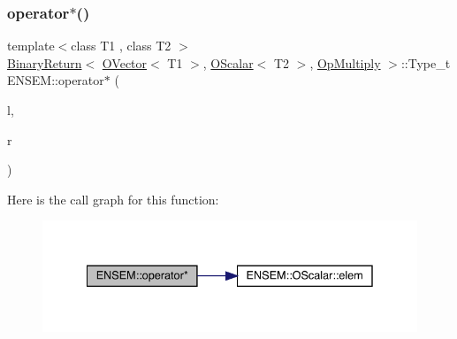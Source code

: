 \subsubsection{\texorpdfstring{operator$\ast$()}{operator*()}\hspace{0.1cm}{\footnotesize\ttfamily [3/8]}}
{\footnotesize\ttfamily template$<$class T1 , class T2 $>$ \\
\mbox{\hyperlink{structENSEM_1_1BinaryReturn}{Binary\+Return}}$<$ \mbox{\hyperlink{classENSEM_1_1OVector}{O\+Vector}}$<$ T1 $>$, \mbox{\hyperlink{classENSEM_1_1OScalar}{O\+Scalar}}$<$ T2 $>$, \mbox{\hyperlink{structENSEM_1_1OpMultiply}{Op\+Multiply}} $>$\+::Type\+\_\+t E\+N\+S\+E\+M\+::operator$\ast$ (\begin{DoxyParamCaption}\item[{const \mbox{\hyperlink{classENSEM_1_1OVector}{O\+Vector}}$<$ T1 $>$ \&}]{l,  }\item[{const \mbox{\hyperlink{classENSEM_1_1OScalar}{O\+Scalar}}$<$ T2 $>$ \&}]{r }\end{DoxyParamCaption})\hspace{0.3cm}{\ttfamily [inline]}}

Here is the call graph for this function\+:\nopagebreak
\begin{figure}[H]
\begin{center}
\leavevmode
\includegraphics[width=335pt]{da/d59/group__obsvector_gabb4c9b103a03a23a7cc8db755ded0b7c_cgraph}
\end{center}
\end{figure}
\mbox{\label{group__obsvector_ga7ba413a9121973912be1ff1686cec922}} 
